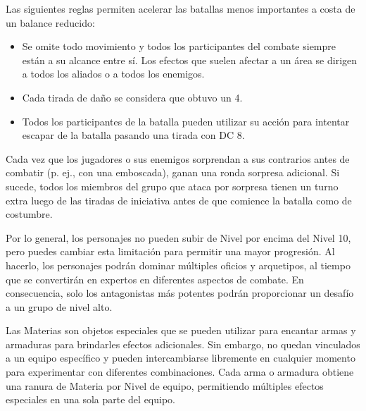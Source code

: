 \begin{description}[leftmargin=*]
\item[\color{accent} Batallas rápidas:] Las siguientes reglas permiten acelerar las batallas menos importantes a costa de un balance reducido:
\begin{itemize}[leftmargin=*]   
	\item Se omite todo movimiento y todos los participantes del combate siempre están a su alcance entre sí. Los efectos que suelen afectar a un área se dirigen a todos los aliados o a todos los enemigos.
	\item Cada tirada de daño se considera que obtuvo un 4.
	\item Todos los participantes de la batalla pueden utilizar su acción para intentar escapar de la batalla pasando una tirada con DC 8.
\end{itemize}

\vfill

\item[\color{accent} Ataque furtivo:] Cada vez que los jugadores o sus enemigos sorprendan a sus contrarios antes de combatir (p. ej., con una emboscada), ganan una ronda sorpresa adicional. Si sucede, todos los miembros del grupo que ataca por sorpresa tienen un turno extra luego de las tiradas de iniciativa antes de que comience la batalla como de costumbre.

\vfill

\item[\color{accent} Niveles ilimitados:] Por lo general, los personajes no pueden subir de Nivel por encima del Nivel 10, pero puedes cambiar esta limitación para permitir una mayor progresión. Al hacerlo, los personajes podrán dominar múltiples oficios y arquetipos, al tiempo que se convertirán en expertos en diferentes aspectos de combate. En consecuencia, solo los antagonistas más potentes podrán proporcionar un desafío a un grupo de nivel alto.

\vfill

\item[\color{accent} Materia:] Las Materias son objetos especiales que se pueden utilizar para encantar armas y armaduras para brindarles efectos adicionales. Sin embargo, no quedan vinculados a un equipo específico y pueden intercambiarse libremente en cualquier momento para experimentar con diferentes combinaciones. Cada arma o armadura obtiene una ranura de Materia por Nivel de equipo, permitiendo múltiples efectos especiales en una sola parte del equipo.

\end{description}

\clearpage

